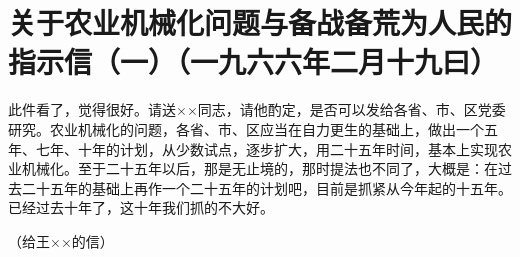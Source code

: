 \section[关于农业机械化问题与备战备荒为人民的指示信（一）（一九六六年二月十九曰）]{关于农业机械化问题与备战备荒为人民的指示信（一）（一九六六年二月十九曰）}


此件看了，觉得很好。请送××同志，请他酌定，是否可以发给各省、市、区党委研究。农业机械化的问题，各省、市、区应当在自力更生的基础上，做出一个五年、七年、十年的计划，从少数试点，逐步扩大，用二十五年时间，基本上实现农业机械化。至于二十五年以后，那是无止境的，那时提法也不同了，大概是：在过去二十五年的基础上再作一个二十五年的计划吧，目前是抓紧从今年起的十五年。已经过去十年了，这十年我们抓的不大好。

（给王××的信）


